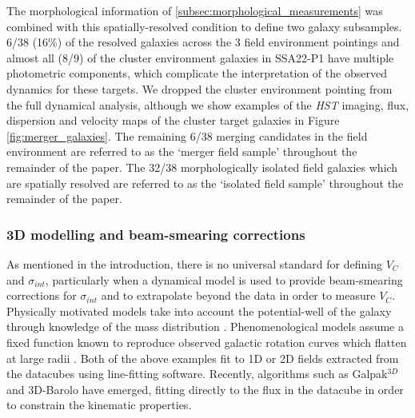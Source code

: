 \documentclass[fleqn,usenatbib]{mnras}
\begin{document}
\noindent
The morphological information of \cref{subsec:morphological_measurements} was combined with this spatially-resolved condition to define two galaxy subsamples.
6/38 (16\%) of the resolved galaxies across the 3 field environment pointings and almost all (8/9) of the cluster environment galaxies in SSA22-P1 have multiple photometric components, which complicate the interpretation of the observed dynamics for these targets.
We dropped the cluster environment pointing from the full dynamical analysis, although we show examples of the {\em HST} imaging, flux, dispersion and velocity maps of the cluster target galaxies in Figure \ref{fig:merger_galaxies}.
The remaining 6/38 merging candidates in the field environment are referred to as the `merger field sample' throughout the remainder of the paper.
The 32/38 morphologically isolated field galaxies which are spatially resolved are referred to as the `isolated field sample' throughout the remainder of the paper.

\subsubsection{3D modelling and beam-smearing corrections}\label{subsec:3d_modelling}

As mentioned in the introduction, there is no universal standard for defining $V_{C}$ and $\sigma_{int}$, particularly when a dynamical model is used to provide beam-smearing corrections for $\sigma_{int}$ and to extrapolate beyond the data in order to measure $V_{C}$.
Physically motivated models take into account the potential-well of the galaxy through knowledge of the mass distribution \citep[e.g.][]{Genzel2008,ForsterSchreiber2009,Gnerucci2011,Wisnioski2015,Swinbank2017}.
Phenomenological models assume a fixed function known to reproduce observed galactic rotation curves which flatten at large radii \citep[e.g.][]{Epinat2010,Epinat2012,Swinbank2012,Stott2016,Harrison2017}.
Both of the above examples fit to 1D or 2D fields extracted from the datacubes using line-fitting software.
Recently, algorithms such as Galpak$^{3D}$ \citep{Bouche2015} and 3D-Barolo \citep{DiTeodoro2015} have emerged, fitting directly to the flux in the datacube in order to constrain the kinematic properties.
\end{document}

